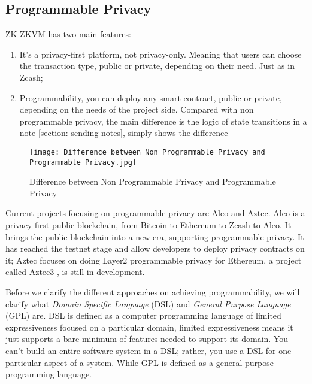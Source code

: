 \subsection{Programmable Privacy}

ZK-ZKVM has two main features:

\begin{enumerate}
    \item It's a privacy-first platform, not privacy-only. Meaning that users can choose the transaction type, public or private, depending on their need. Just as in Zcash;
    \item Programmability, you can deploy any smart contract, public or private, depending on the needs of the project side. Compared with non programmable privacy, the main difference is the logic of state transitions in a note \ref{section: sending-notes},  simply shows the difference 
\end{enumerate}

\begin{figure}[!ht]
    \centering
    \texttt{[image: Difference between Non Programmable Privacy and Programmable Privacy.jpg]}
    \caption{Difference between Non Programmable Privacy and Programmable Privacy}
    \label{fig:Difference between Non Programmable Privacy and Programmable Privacy}
\end{figure}

Current projects focusing on programmable privacy are Aleo \cite{website:Aleo} and Aztec. Aleo is a privacy-first public blockchain, from Bitcoin \cite{website:BTC} to Ethereum to Zcash \cite{website:Zcash} to Aleo. It brings the public blockchain into a new era,
supporting programmable privacy.
It has reached the testnet stage and allow developers to deploy privacy contracts on it; 
Aztec focuses on doing Layer2 programmable privacy for Ethereum, a project 
called Aztec3 \cite{website:Aztec3}, is still in development.

Before we clarify the different approaches on achieving programmability, we will clarify what \textit{Domain Specific Language} (DSL) and \textit{General Purpose Language} (GPL) \cite{website:DSL} are. DSL is defined as a computer programming language of limited expressiveness focused on a particular domain, limited expressiveness means it just supports a bare minimum of features 
needed to support its domain. You can't build an entire software system in a DSL; rather, you use a DSL for one particular aspect of a system. While GPL is defined as a general-purpose programming language.

